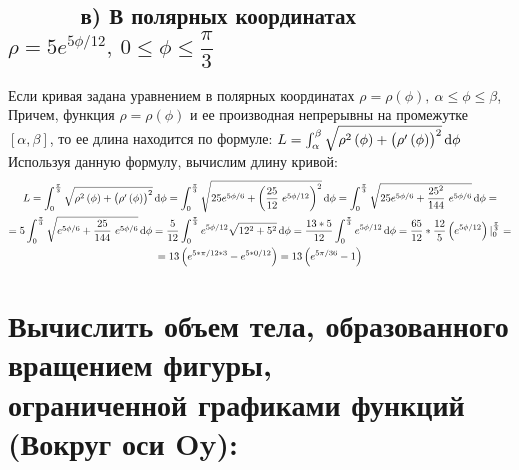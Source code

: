 \documentclass{article}
\begin{document}
			\subsection*{\ \ \ \ \ \ в) В полярных координатах \ $\rho = 5 e ^{5\phi/12}, \ 0 \le \phi \le \dfrac{\pi}3$}
				Если кривая задана уравнением в полярных координатах $\rho = \rho\left(\phi\right), \ \alpha \le \phi \le \beta$, Причем, функция $\rho = \rho\left(\phi\right)$ и ее производная непрерывны на промежутке $[\alpha,  \beta]$, то ее длина находится по формуле: $L = \int_\alpha^\beta \sqrt{\rho^2 \left(\phi\right) + \left(\rho' \left(\phi\right)\right)^2} \dif \phi$ \\Используя данную формулу, вычислим длину кривой:
				\begin{multline*}
					L = \int_0^\frac{\pi}3 \sqrt{\rho^2 \left(\phi\right) + \left(\rho' \left(\phi\right)\right)^2} \dif \phi = \int_0^\frac{\pi}3 \sqrt{25 e^{5\phi/6} + \left(\dfrac{25}{12} \ e ^{5\phi/12}\right)^2} \dif \phi = \int_0^\frac{\pi}3 \sqrt{25 e^{5\phi/6} +  \dfrac{25^2}{144} \ e ^{5\phi/6}} \dif \phi =\\= 5 \int_0^\frac{\pi}3 \sqrt{e^{5\phi/6} + \dfrac{25}{144} \ e ^{5\phi/6}} \dif \phi = \dfrac 5{12} \int_0^\frac{\pi}3 e^{5\phi/12}\sqrt{12^2 + 5^2} \dif \phi = \dfrac{13*5}{12} \int_0^\frac{\pi}3 e^{5\phi/12} \dif \phi = \dfrac{65}{12} * \dfrac{12}{5} \left(e^{5\phi/12}\right)|_0^\frac{\pi}3 =\\= 13 \left(e^{5*\pi/12*3} - e^{5*0/12}\right) = 13\left(e^{5\pi/36} - 1\right)
				\end{multline*}
				
		\section{Вычислить объем тела, образованного вращением фигуры, \\ограниченной графиками функций (Вокруг оси Oy):}
\end{document}
